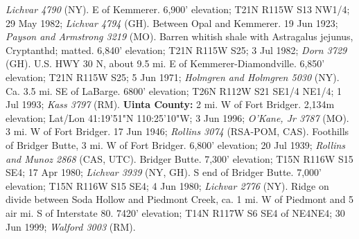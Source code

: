 \textit{Lichvar 4790} (NY).
E of Kemmerer. 6,900' elevation; T21N R115W S13 NW1/4; 29 May 1982;
\textit{Lichvar 4794} (GH).
Between Opal and Kemmerer. 19 Jun 1923; \textit{Payson and Armstrong 3219} (MO).
Barren whitish shale with Astragalus jejunus, Cryptanthd; matted.
6,840' elevation; T21N R115W S25; 3 Jul 1982; \textit{Dorn 3729} (GH).
U.S. HWY 30 N, about 9.5 mi. E of Kemmerer-Diamondville. 6,850' elevation;
T21N R115W S25; 5 Jun 1971; \textit{Holmgren and Holmgren 5030} (NY).
Ca. 3.5 mi. SE of LaBarge. 6800' elevation; T26N R112W S21 SE1/4 NE1/4;
1 Jul 1993; \textit{Kass 3797} (RM).
  \textbf{Uinta County:}
2 mi. W of Fort Bridger. 2,134m elevation; Lat/Lon 41:19'51"N 110:25'10"W;
3 Jun 1996; \textit{O'Kane, Jr 3787} (MO).
3 mi. W of Fort Bridger. 17 Jun 1946; \textit{Rollins 3074} (RSA-POM, CAS).
Foothills of Bridger Butte, 3 mi. W of Fort Bridger. 6,800' elevation;
20 Jul 1939; \textit{Rollins and Munoz 2868} (CAS, UTC).
Bridger Butte. 7,300' elevation; T15N R116W S15 SE4; 17 Apr 1980;
\textit{Lichvar 3939} (NY, GH).
S end of Bridger Butte. 7,000' elevation; T15N R116W S15 SE4; 4 Jun 1980;
\textit{Lichvar 2776} (NY).
Ridge on divide between Soda Hollow and Piedmont Creek, ca. 1 mi. W of Piedmont
and 5 air mi. S of Interstate 80. 7420' elevation; T14N R117W S6 SE4 of NE4NE4;
30 Jun 1999; \textit{Walford 3003} (RM).

